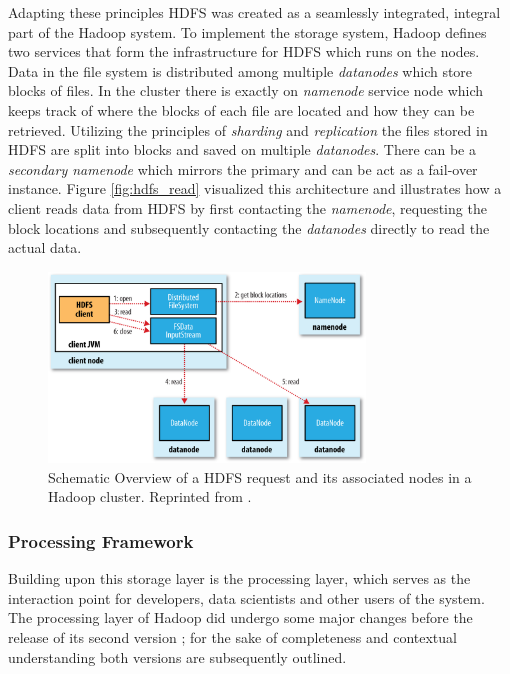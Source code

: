 Adapting these principles \ac{HDFS} was created as a seamlessly integrated, integral part of the Hadoop system. To implement the storage system, 
Hadoop defines two services that form the infrastructure for \ac{HDFS} which runs on the nodes. Data in the file system is distributed among multiple \emph{datanodes} which store blocks of files. In the cluster there is exactly on \emph{namenode} service node which keeps track of where the blocks of each file are located and how they can be retrieved. Utilizing the principles of \emph{sharding} and \emph{replication} the files stored in \ac{HDFS} are split into blocks and saved on multiple \emph{datanodes}. There can be a \emph{secondary namenode} which  mirrors the primary and can be act as a fail-over instance. Figure \autoref{fig:hdfs_read} visualized this architecture and illustrates how a client reads data from \ac{HDFS} by first contacting the \emph{namenode}, requesting the block locations and subsequently contacting the \emph{datanodes} directly to read the actual data.

\begin{figure}[htb]
     {\centering\includegraphics[width=0.75\textwidth]{img/hddg_0302.png}\par}
	\caption{Schematic Overview of a \ac{HDFS} request and its associated nodes in a Hadoop cluster. Reprinted from \textcite[][Chap.~3]{white2015hadoop}.}
	\label{fig:hdfs_read}
\end{figure}

\subsubsection{Processing Framework}

Building upon this storage layer is the processing layer, which serves as the interaction point for developers, data scientists and other users of the system. The processing layer of Hadoop did undergo some major changes before the release of its second version \autocite[p.~5]{vavilapalli2013apache}; for the sake of completeness and contextual understanding both versions are subsequently outlined.

